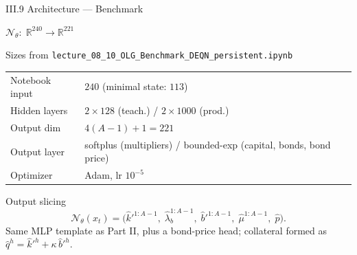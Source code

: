 \documentclass[aspectratio=169,11pt]{beamer}
\newcommand{\R}{\mathbb{R}}
\newcommand{\N}{\mathcal{N}}
\begin{document}
\begin{frame}{III.9 Architecture --- Benchmark}
\scriptsize
\begin{center}
$\N_\theta:\;\R^{240} \to \R^{221}$
\end{center}
\vspace{-4pt}

\begin{block}{Sizes from \texttt{lecture\_08\_10\_OLG\_Benchmark\_DEQN\_persistent.ipynb}}
\centering
\begin{tabular}{ll}
\toprule
Notebook input   & $240$ (minimal state: $113$) \\
Hidden layers    & $2{\times}128$ (teach.) / $2{\times}1000$ (prod.) \\
Output dim       & $4(A{-}1) + 1 = 221$ \\
Output layer     & softplus (multipliers) / bounded-exp (capital, bonds, bond price) \\
Optimizer        & Adam, lr $10^{-5}$\\
\bottomrule
\end{tabular}
\end{block}

\vspace{-3pt}
\begin{exampleblock}{Output slicing}
\vspace{-6pt}
\[
\N_\theta(x_t)
=
\bigl(\hat k'^{1:A-1},\;\hat\lambda_b^{1:A-1},\;\hat b'^{1:A-1},\;\hat\mu^{1:A-1},\;\hat p\bigr).
\]
\vspace{-4pt}
Same MLP template as Part II, plus a bond-price head; collateral formed as $\hat q^h=\hat k'^h+\kappa\,\hat b'^h$.
\end{exampleblock}
\end{frame}
\end{document}

